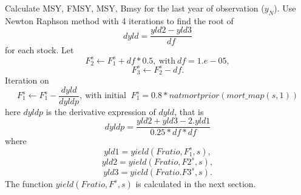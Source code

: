 \documentclass{article}
\begin{document}
Calculate MSY, FMSY, MSY, Bmsy for the last year of observation ($y_N$). 
Use Newton Raphson method with 4 iterations to find the root of
\begin{equation}
        dyld=\dfrac{yld2-yld3}{df}
    \end{equation}
    for each stock.
    Let 
    \begin{equation}
        F_2^s \leftarrow F_1^s + df*0.5, \ \text{with}  \ df=1.e-05,
    \end{equation}
    \begin{equation}
        F_3^s\leftarrow F_2^s-df.
    \end{equation}
Iteration on
\begin{equation}
    F_1^s\leftarrow F_1^s-\dfrac{dyld}{dyldp}, \ \text{with initial } \ F_1^s=0.8*natmortprior(mort\_map(s,1))
\end{equation}
    here $dyldp$ is the derivative expression of $dyld$, that is
\begin{equation}
    dyldp=\dfrac{yld2+yld3 - 2.yld1}{0.25*df*df}
\end{equation}
where
\begin{equation}
    yld1=yield(Fratio,F_1^s,s),
\end{equation}
\begin{equation}
    yld2=yield(Fratio,F2^s,s),
\end{equation}
\begin{equation}
    yld3=yield(Fratio.F3^s,s).
\end{equation}
The function $yield(Fratio,F^s,s)$ is calculated in the next section.\\
\end{document}
